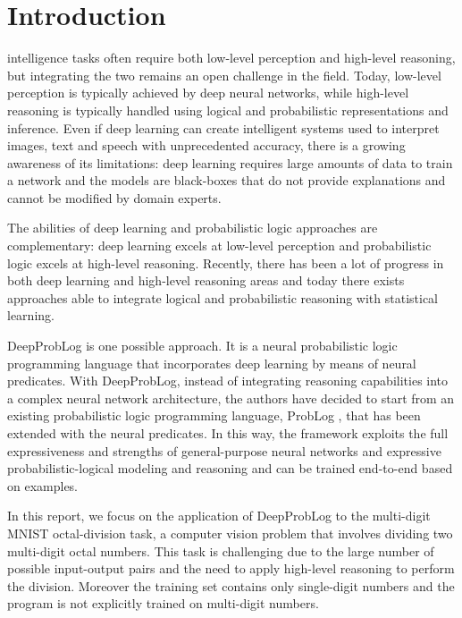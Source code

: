 \section{Introduction}
 intelligence tasks often require both low-level perception and high-level reasoning, but integrating the two remains an open challenge in the field.
Today, low-level perception is typically achieved by deep neural networks, while high-level reasoning is typically handled using logical and probabilistic representations and inference. Even if deep learning can create intelligent systems used to interpret images, text and speech with unprecedented accuracy, there is a growing awareness of its limitations: deep learning requires large amounts of data to train a network and the models are black-boxes that do not provide explanations and cannot be modified by domain experts. 

The abilities of deep learning and probabilistic logic approaches are complementary: deep learning excels at low-level perception and probabilistic logic excels at high-level reasoning. Recently, there has been a lot of progress in both deep learning and high-level reasoning areas and today there exists approaches able to integrate logical and probabilistic reasoning with statistical learning.

DeepProbLog \cite{DeepProbLog} is one possible approach. It is a neural probabilistic logic programming language that incorporates deep learning by means of neural predicates. With DeepProbLog, instead of integrating reasoning capabilities into a complex neural network architecture, the authors have decided to start from an existing probabilistic logic programming language, ProbLog \cite{ProbLog}, that has been extended with the neural predicates. In this way, the framework exploits the full expressiveness and strengths of general-purpose neural networks and expressive probabilistic-logical modeling and reasoning and can be trained end-to-end based on examples.

In this report, we focus on the application of DeepProbLog to the multi-digit MNIST octal-division task, a computer vision problem that involves dividing two multi-digit octal numbers. This task is challenging due to the large number of possible input-output pairs and the need to apply high-level reasoning to perform the division. Moreover the training set contains only single-digit numbers and the program is not explicitly trained on multi-digit numbers.

